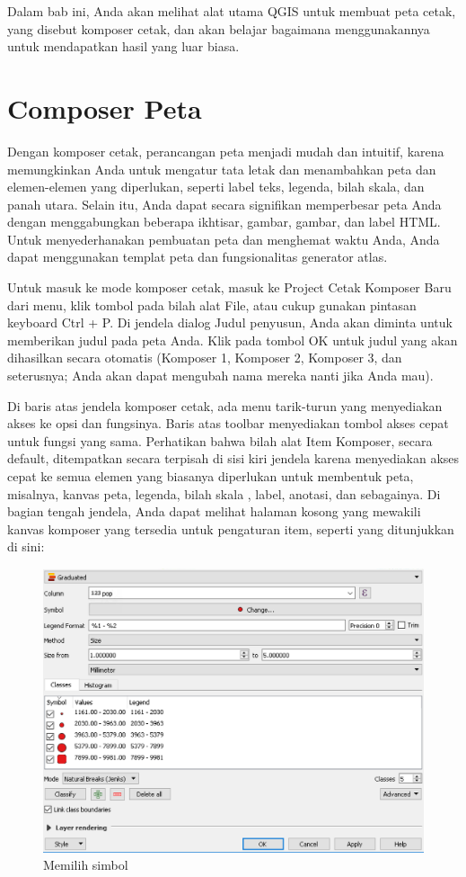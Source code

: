 \documentclass[]{book}
\begin{document}
Dalam bab ini, Anda akan melihat alat utama QGIS untuk membuat peta cetak, yang disebut komposer cetak, dan akan belajar bagaimana menggunakannya untuk mendapatkan hasil yang luar biasa.

\hypertarget{composer-peta}{%
\section{Composer Peta}\label{composer-peta}}

Dengan komposer cetak, perancangan peta menjadi mudah dan intuitif, karena memungkinkan Anda untuk mengatur tata letak dan menambahkan peta dan elemen-elemen yang diperlukan, seperti label teks, legenda, bilah skala, dan panah utara. Selain itu, Anda dapat secara signifikan memperbesar peta Anda dengan menggabungkan beberapa ikhtisar, gambar, gambar, dan label HTML. Untuk menyederhanakan pembuatan peta dan menghemat waktu Anda, Anda dapat menggunakan templat peta dan fungsionalitas generator atlas.

Untuk masuk ke mode komposer cetak, masuk ke Project \textbar{} Cetak Komposer Baru dari menu, klik tombol pada bilah alat File, atau cukup gunakan pintasan keyboard Ctrl + P. Di jendela dialog Judul penyusun, Anda akan diminta untuk memberikan judul pada peta Anda. Klik pada tombol OK untuk judul yang akan dihasilkan secara otomatis (Komposer 1, Komposer 2, Komposer 3, dan seterusnya; Anda akan dapat mengubah nama mereka nanti jika Anda mau).

Di baris atas jendela komposer cetak, ada menu tarik-turun yang menyediakan akses ke opsi dan fungsinya. Baris atas toolbar menyediakan tombol akses cepat untuk fungsi yang sama. Perhatikan bahwa bilah alat Item Komposer, secara default, ditempatkan secara terpisah di sisi kiri jendela karena menyediakan akses cepat ke semua elemen yang biasanya diperlukan untuk membentuk peta, misalnya, kanvas peta, legenda, bilah skala , label, anotasi, dan sebagainya. Di bagian tengah jendela, Anda dapat melihat halaman kosong yang mewakili kanvas komposer yang tersedia untuk pengaturan item, seperti yang ditunjukkan di sini:

\begin{figure}

{\centering \includegraphics[width=0.6\linewidth]{images/09/fig97} 

}

\caption{Memilih simbol}\label{fig:fig971}
\end{figure}
\end{document}
